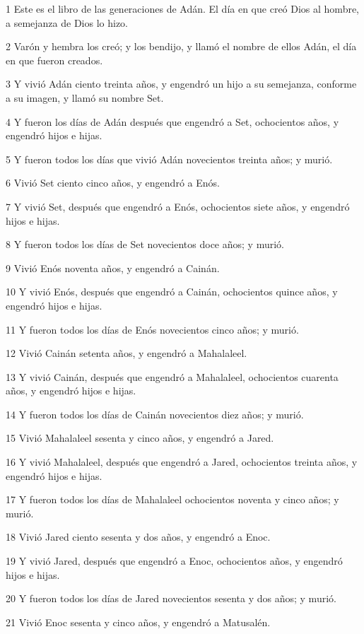 \par 1 Este es el libro de las generaciones de Adán. El día en que creó Dios al hombre, a semejanza de Dios lo hizo.
\par 2 Varón y hembra los creó; y los bendijo, y llamó el nombre de ellos Adán, el día en que fueron creados.
\par 3 Y vivió Adán ciento treinta años, y engendró un hijo a su semejanza, conforme a su imagen, y llamó su nombre Set.
\par 4 Y fueron los días de Adán después que engendró a Set, ochocientos años, y engendró hijos e hijas.
\par 5 Y fueron todos los días que vivió Adán novecientos treinta años; y murió.
\par 6 Vivió Set ciento cinco años, y engendró a Enós.
\par 7 Y vivió Set, después que engendró a Enós, ochocientos siete años, y engendró hijos e hijas.
\par 8 Y fueron todos los días de Set novecientos doce años; y murió.
\par 9 Vivió Enós noventa años, y engendró a Cainán.
\par 10 Y vivió Enós, después que engendró a Cainán, ochocientos quince años, y engendró hijos e hijas.
\par 11 Y fueron todos los días de Enós novecientos cinco años; y murió.
\par 12 Vivió Cainán setenta años, y engendró a Mahalaleel.
\par 13 Y vivió Cainán, después que engendró a Mahalaleel, ochocientos cuarenta años, y engendró hijos e hijas.
\par 14 Y fueron todos los días de Cainán novecientos diez años; y murió.
\par 15 Vivió Mahalaleel sesenta y cinco años, y engendró a Jared.
\par 16 Y vivió Mahalaleel, después que engendró a Jared, ochocientos treinta años, y engendró hijos e hijas.
\par 17 Y fueron todos los días de Mahalaleel ochocientos noventa y cinco años; y murió.
\par 18 Vivió Jared ciento sesenta y dos años, y engendró a Enoc.
\par 19 Y vivió Jared, después que engendró a Enoc, ochocientos años, y engendró hijos e hijas.
\par 20 Y fueron todos los días de Jared novecientos sesenta y dos años; y murió.
\par 21 Vivió Enoc sesenta y cinco años, y engendró a Matusalén.
